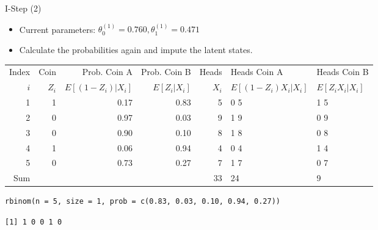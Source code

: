 \documentclass[dvipdfmx,bigger,aspectratio=169]{beamer}
\begin{document}
\begin{frame}[fragile,allowframebreaks,label=,t]{I-Step (2)}
 \begin{itemize}
\item Current parameters: \(\theta_{0}^{(1)} = 0.760, \theta_{1}^{(1)} = 0.471\)
\item Calculate the probabilities again and impute the latent states.
\end{itemize}
\footnotesize
\begin{center}
\begin{tabular}{r|r|rr|r|ll|}
Index & Coin & Prob. Coin A & Prob. Coin B & Heads & Heads Coin A & Heads Coin B\\
\(i\) & \(Z_{i}\) & \(E[(1-Z_{i})\vert X_{i}]\) & \(E[Z_{i}\vert X_{i}]\) & \(X_{i}\) & \(E[(1-Z_{i}) X_{i} \vert X_{i}]\) & \(E[Z_{i} X_{i} \vert X_{i}]\)\\
\hline
1 & 1 & 0.17 & 0.83 & 5 & 0 \texttimes{} 5 & 1 \texttimes{} 5\\
2 & 0 & 0.97 & 0.03 & 9 & 1 \texttimes{} 9 & 0 \texttimes{} 9\\
3 & 0 & 0.90 & 0.10 & 8 & 1 \texttimes{} 8 & 0 \texttimes{} 8\\
4 & 1 & 0.06 & 0.94 & 4 & 0 \texttimes{} 4 & 1 \texttimes{} 4\\
5 & 0 & 0.73 & 0.27 & 7 & 1 \texttimes{} 7 & 0 \texttimes{} 7\\
\hline
Sum &  &  &  & 33 & 24 & 9\\
\end{tabular}
\end{center}
\normalsize
\scriptsize
\begin{verbatim}
rbinom(n = 5, size = 1, prob = c(0.83, 0.03, 0.10, 0.94, 0.27))
\end{verbatim}

\begin{verbatim}
[1] 1 0 0 1 0
\end{verbatim}



\end{frame}
\end{document}
